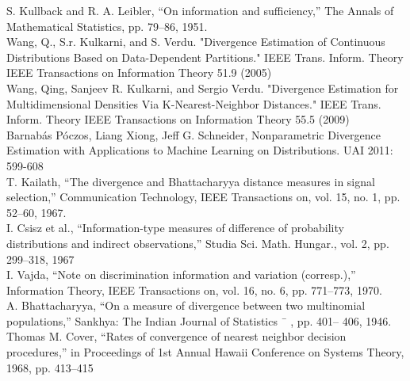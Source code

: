 \documentclass{article}
\begin{document}
	\noindent [26] S. Kullback and R. A. Leibler, “On information and sufficiency,” The	Annals of Mathematical 
	\indent Statistics, pp. 79–86, 1951.
	\\ [0.5ex]
	
	\noindent [27] Wang, Q., S.r. Kulkarni, and S. Verdu. "Divergence Estimation of Continuous Distributions 
	\indent Based on Data-Dependent Partitions." IEEE Trans. Inform. Theory IEEE Transactions on 
	\indent Information Theory 51.9 (2005)
	\\ [0.5ex]
	
	\noindent [28] Wang, Qing, Sanjeev R. Kulkarni, and Sergio Verdu. "Divergence Estimation for Multidimensional 
	\indent Densities Via K-Nearest-Neighbor Distances." IEEE Trans. Inform. Theory IEEE Transactions 
	\indent on Information Theory 55.5 (2009)
	\\ [0.5ex]

	\noindent [29] Barnabás Póczos, Liang Xiong, Jeff G. Schneider, Nonparametric Divergence Estimation with 
	\indent Applications to Machine Learning on Distributions. UAI 2011: 599-608
	\\ [0.5ex]
	
	\noindent [30] T. Kailath, “The divergence and Bhattacharyya distance measures in signal selection,” Communication 
	\indent Technology, IEEE Transactions on,	vol. 15, no. 1, pp. 52–60, 1967.
	\\ [0.5ex]
	
	\noindent [31] I. Csisz et al., “Information-type measures of difference of probability	distributions and indirect 
	\indent observations,” Studia Sci. Math. Hungar.,
	vol. 2, pp. 299–318, 1967
	\\ [0.5ex]
	
	\noindent [32] I. Vajda, “Note on discrimination information and variation (corresp.),”	Information Theory, IEEE 
	\indent Transactions on, vol. 16, no. 6, pp. 771–773, 1970.
	\\ [0.5ex]
	
	\noindent [33] A. Bhattacharyya, “On a measure of divergence between two multinomial populations,” Sankhya: 
	\indent The Indian Journal of Statistics ¯ , pp. 401–
	406, 1946.
	\\[0.5 ex]
	
	\noindent [34] Thomas M. Cover, “Rates of convergence of nearest
	neighbor decision procedures,” in Proceedings \indent of 1st
	Annual Hawaii Conference on Systems Theory, 1968,
	pp. 413–415
	\indent
	\\[0.5ex]
	
\end{document}
